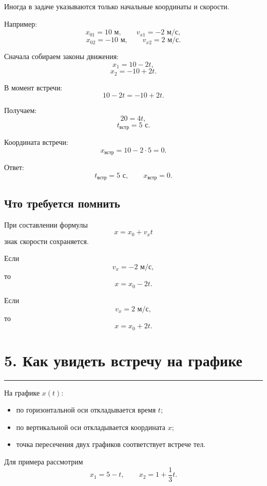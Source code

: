\documentclass[a4paper,12pt]{article}
\newcommand{\sectionline}{%
    \vspace{-0.4em}
    {\color{accent}\rule{\linewidth}{0.7pt}}
    \vspace{0.4em}
}
\begin{document}
Иногда в задаче указываются только начальные координаты и скорости.

Например:
\[
x_{01}=10\text{ м},
\qquad
v_{x1}=-2\text{ м/с},
\]
\[
x_{02}=-10\text{ м},
\qquad
v_{x2}=2\text{ м/с}.
\]

Сначала собираем законы движения:
\[
x_1=10-2t,
\]
\[
x_2=-10+2t.
\]

В момент встречи:
\[
10-2t=-10+2t.
\]

Получаем:
\[
20=4t,
\]
\[
\boxed{t_{\text{встр}}=5\text{ с}}.
\]

Координата встречи:
\[
x_{\text{встр}}=10-2\cdot5=0.
\]

Ответ:
\[
\boxed{t_{\text{встр}}=5\text{ с}},
\qquad
\boxed{x_{\text{встр}}=0}.
\]

\subsection*{Что требуется помнить}

При составлении формулы
\[
x=x_0+v_xt
\]
знак скорости сохраняется.

Если
\[
v_x=-2\text{ м/с},
\]
то
\[
x=x_0-2t.
\]

Если
\[
v_x=2\text{ м/с},
\]
то
\[
x=x_0+2t.
\]


\section*{\color{darkaccent}5. Как увидеть встречу на графике}
\sectionline

На графике \(x(t)\):

\begin{itemize}
    \item по горизонтальной оси откладывается время \(t\);
    \item по вертикальной оси откладывается координата \(x\);
    \item точка пересечения двух графиков соответствует встрече тел.
\end{itemize}

Для примера рассмотрим
\[
x_1=5-t,
\qquad
x_2=1+\frac13t.
\]
\end{document}
